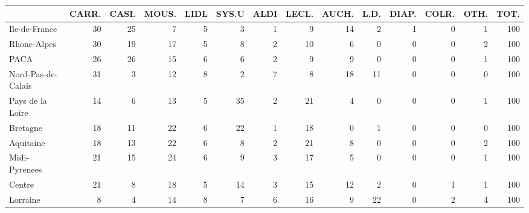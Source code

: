 \documentclass[11pt]{article}
\begin{document}
\begin{table}[H]
\begin{tabular}{lrrrrrrrrrrrrr}
\toprule
\toprule
{} &      CARR. &      CASI. &      MOUS. &       LIDL &      SYS.U &       ALDI &      LECL. &      AUCH. &       L.D. &      DIAP. &      COLR. &       OTH. &       TOT. \\
\midrule
Ile-de-France        &         30 &         25 &          7 &          5 &          3 &          1 &          9 &         14 &          2 &          1 &          0 &          1 &        100 \\
Rhone-Alpes          &         30 &         19 &         17 &          5 &          8 &          2 &         10 &          6 &          0 &          0 &          0 &          2 &        100 \\
PACA                 &         26 &         26 &         15 &          6 &          6 &          2 &          9 &          9 &          0 &          0 &          0 &          1 &        100 \\
Nord-Pas-de-Calais   &         31 &          3 &         12 &          8 &          2 &          7 &          8 &         18 &         11 &          0 &          0 &          0 &        100 \\
Pays de la Loire     &         14 &          6 &         13 &          5 &         35 &          2 &         21 &          4 &          0 &          0 &          0 &          1 &        100 \\
Bretagne             &         18 &         11 &         22 &          6 &         22 &          1 &         18 &          0 &          1 &          0 &          0 &          0 &        100 \\
Aquitaine            &         18 &         13 &         22 &          6 &          8 &          2 &         21 &          8 &          0 &          0 &          0 &          2 &        100 \\
Midi-Pyrenees        &         21 &         15 &         24 &          6 &          9 &          3 &         17 &          5 &          0 &          0 &          0 &          1 &        100 \\
Centre               &         21 &          8 &         18 &          5 &         14 &          3 &         15 &         12 &          2 &          0 &          1 &          1 &        100 \\
Lorraine             &          8 &          4 &         14 &          8 &          7 &          6 &         16 &          9 &         22 &          0 &          2 &          4 &        100 \\

\end{tabular}
\end{table}
\end{document}
